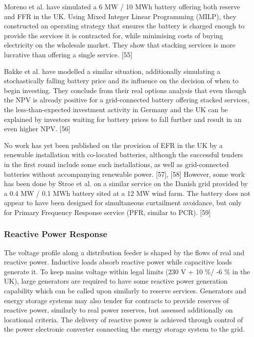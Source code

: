 \documentclass[report_18month.tex]{subfiles}
\begin{document}
Moreno et al. have simulated a 6 MW / 10 MWh battery offering both reserve and FFR in the UK. Using Mixed Integer Linear Programming (MILP), they constructed an operating strategy that ensures the battery is charged enough to provide the services it is contracted for, while minimising costs of buying electricity on the wholesale market. They show that stacking services is more lucrative than offering a single service. [55]

Bakke et al. have modelled a similar situation, additionally simulating a stochastically falling battery price and its influence on the decision of when to begin investing. They conclude from their real options analysis that even though the NPV is already positive for a grid-connected battery offering stacked services, the less-than-expected investment activity in Germany and the UK can be explained by investors waiting for battery prices to fall further and result in an even higher NPV. [56]

No work has yet been published on the provision of EFR in the UK by a renewable installation with co-located batteries, although the successful tenders in the first round include some such installations, as well as grid-connected batteries without accompanying renewable power. [57], [58] However, some work has been done by Stroe et al. on a similar service on the Danish grid provided by a 0.4 MW / 0.1 MWh battery sited at a 12 MW wind farm. The battery does not appear to have been designed for simultaneous curtailment avoidance, but only for Primary Frequency Response service (PFR, similar to PCR). [59]

\subsubsection{Reactive Power Response}
The voltage profile along a distribution feeder is shaped by the flows of real and reactive power. Inductive loads absorb reactive power while capacitive loads generate it. To keep mains voltage within legal limits (230 V + 10 \%/ -6 \% in the UK), large generators are required to have some reactive power generation capability which can be called upon similarly to reserve services. Generators and energy storage systems may also tender for contracts to provide reserves of reactive power, similarly to real power reserves, but assessed additionally on locational criteria. The delivery of reactive power is achieved through control of the power electronic converter connecting the energy storage system to the grid.
\end{document}
